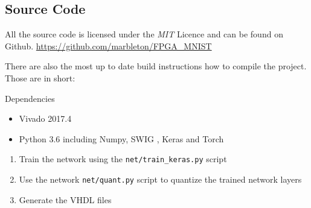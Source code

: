 \subsection{Source Code}

All the source code is licensed under the \emph{MIT} Licence and can be found on Github.
\url{https://github.com/marbleton/FPGA\_MNIST}

There are also the most up to date build instructions how to compile the project. Those are in short:

Dependencies
\begin{itemize}
	\item Vivado 2017.4
	\item Python 3.6 including Numpy, SWIG \cite{Swig2020}, Keras and Torch
\end{itemize}

\begin{enumerate}
	\item Train the network using the \texttt{net/train\_keras.py} script
	\item Use the network \texttt{net/quant.py} script to quantize the trained network layers
	\item Generate the VHDL files
\end{enumerate}

